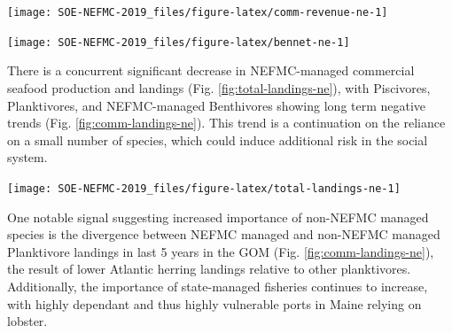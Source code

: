 \documentclass[10pt,]{article}
\let\origfigure\figure
\let\endorigfigure\endfigure
\renewenvironment{figure}[1][2] {
    \expandafter\origfigure\expandafter[H]
} {
    \endorigfigure
}
\begin{document}
\begin{figure}

{\centering \texttt{[image: SOE-NEFMC-2019\_files/figure-latex/comm-revenue-ne-1]} 

}

\caption{Total commercial revenue (black) and revenue from NEFMC managed species (red) in Gulf of Maine (left) and Georges Bank (right).}\label{fig:comm-revenue-ne}
\end{figure}

\begin{figure}

{\centering \texttt{[image: SOE-NEFMC-2019\_files/figure-latex/bennet-ne-1]} 

}

\caption{Revenue change from the long-term mean in 2015 dollars (black), Price (PI), and Volume Indicators (VI) for commercial benthivore landings in Gulf of Maine (left) and for commercial benthos landings on Georges Bank (right).}\label{fig:bennet-ne}
\end{figure}

There is a concurrent significant decrease in NEFMC-managed commercial
seafood production and landings (Fig. \ref{fig:total-landings-ne}), with
Piscivores, Planktivores, and NEFMC-managed Benthivores showing long
term negative trends (Fig. \ref{fig:comm-landings-ne}). This trend is a
continuation on the reliance on a small number of species, which could
induce additional risk in the social system.

\begin{figure}

{\centering \texttt{[image: SOE-NEFMC-2019\_files/figure-latex/total-landings-ne-1]} 

}

\caption{Total commercial seafood landings (black) shown with NEFMC managed seafood landings (red) in Gulf of Maine (left) and Georges Bank (right).}\label{fig:total-landings-ne}
\end{figure}

One notable signal suggesting increased importance of non-NEFMC managed
species is the divergence between NEFMC managed and non-NEFMC managed
Planktivore landings in last 5 years in the GOM (Fig.
\ref{fig:comm-landings-ne}), the result of lower Atlantic herring
landings relative to other planktivores. Additionally, the importance of
state-managed fisheries continues to increase, with highly dependant and
thus highly vulnerable ports in Maine relying on lobster.
\end{document}
